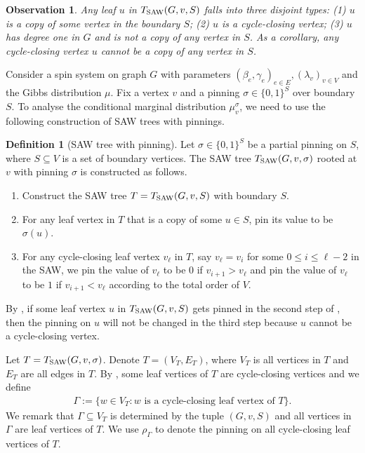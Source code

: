 \documentclass[11pt]{amsart}
\newcommand{\defeq}{:=}
\newtheorem{observation}[theorem]{Observation}
\theoremstyle{definition}
\newtheorem{definition}[theorem]{Definition}
\theoremstyle{remark}
\begin{document}
\begin{observation}\label{obs:leaf-vertices-in-saw-tree-with-boundary}
    Any leaf $u$ in $T_{\textnormal{SAW}}(G,v,S)$ falls into three disjoint types: (1) $u$ is a copy of some vertex in the boundary $S$; (2) $u$ is a cycle-closing vertex; (3) $u$ has degree one in $G$ and is not a copy of any vertex in $S$. As a corollary, any cycle-closing vertex $u$ cannot be a copy of any vertex in $S$.
\end{observation}

Consider a spin system on graph $G$ with parameters $(\beta_e,\gamma_e)_{e \in E},(\lambda_v)_{v \in V}$ and the Gibbs distribution $\mu$. Fix a vertex $v$ and a pinning $\sigma \in \{0,1\}^S$ over boundary $S$. To analyse the conditional marginal distribution $\mu_v^\sigma$, we need to use the following construction of SAW trees with pinnings.

\begin{definition}[SAW tree with pinning]\label{def:saw-tree-with-pinning}
    Let $\sigma \in \{0,1\}^S$ be a partial pinning on $S$, where $S \subseteq V$ is a set of boundary vertices.
    The SAW tree $T_{\textnormal{SAW}}(G,v,\sigma)$ rooted at $v$ with pinning $\sigma$ is constructed as follows.
    \begin{enumerate}
        \item Construct the SAW tree $T = T_{\textnormal{SAW}}(G,v,S)$ with boundary $S$.
        \item For any leaf vertex in $T$ that is a copy of some $u \in S$, pin its value to be $\sigma(u)$.
        \item For any cycle-closing leaf vertex $v_\ell$ in $T$, say $v_\ell = v_i$ for some $0\leq i \leq \ell - 2$ in the SAW, we pin the value of $v_\ell$ to be $0$ if $v_{i+1} > v_\ell$ and pin the value of $v_\ell$ to be $1$ if $v_{i+1} < v_\ell$ according to the total order of $V$.
    \end{enumerate}
    \end{definition}
         
    By , if some leaf vertex $u$ in $T_{\textnormal{SAW}}(G,v,S)$ gets pinned in the second step of , then the pinning on $u$ will not be changed in the third step because $u$ cannot be a cycle-closing vertex.

    Let $T = T_{\textnormal{SAW}}(G,v,\sigma)$.
    Denote $T = (V_T,E_T)$, where $V_T$ is all vertices in $T$ and $E_T$ are all edges in $T$.
    By , some leaf vertices of $T$ are cycle-closing vertices and we define
    \begin{align}\label{eq:gamma}
        \Gamma \defeq \{w \in V_T: w \text{ is a cycle-closing leaf vertex of } T\}.
    \end{align}
    We remark that $\Gamma \subseteq V_T$ is determined by the tuple $(G,v,S)$ and all vertices in $\Gamma$ are leaf vertices of $T$. We use $\rho_\Gamma$ to denote the pinning on all cycle-closing leaf vertices of $T$.    
    
\end{document}
